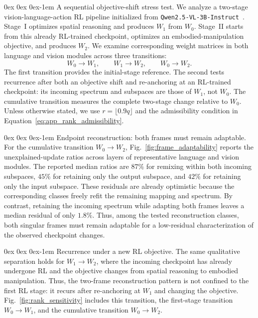 \documentclass[11pt, a4paper]{utda}
\makeatletter
\renewcommand{\paragraph}{%
  \@startsection{paragraph}{4}%
  {\z@}{0ex \@plus 0ex \@minus 0ex}{-1em}%
  {\normalfont\normalsize\bfseries}%
}
\theoremstyle{plain}
\theoremstyle{definition}
\theoremstyle{remark}
\makeatother
\begin{document}
\paragraph{A sequential objective-shift stress test.}
We analyze a two-stage vision-language-action RL pipeline
initialized from
\texttt{Qwen2.5-VL-3B-Instruct}~\cite{yuan2025embodied}.
Stage~I optimizes spatial reasoning and produces $W_1$ from $W_0$.
Stage~II starts from this already RL-trained checkpoint, optimizes
an embodied-manipulation objective, and produces $W_2$.
We examine corresponding weight matrices in both language and
vision modules across three transitions:
\begin{equation}
\label{eq:app-vla_transitions}
    W_0\rightarrow W_1,
    \qquad W_1\rightarrow W_2,
    \qquad W_0\rightarrow W_2.
\end{equation}
The first transition provides the initial-stage reference.
The second tests recurrence after both an objective shift and
re-anchoring at an RL-trained checkpoint: its incoming spectrum
and subspaces are those of $W_1$, not $W_0$.
The cumulative transition measures the complete two-stage change
relative to $W_0$.
Unless otherwise stated, we use $r=\lfloor0.9q\rfloor$ and the
admissibility condition in
Equation~\ref{eq:app_rank_admissibility}.

\paragraph{Endpoint reconstruction: both frames must remain adaptable.}
For the cumulative transition $W_0\rightarrow W_2$,
Fig.~\ref{fig:frame_adaptability} reports the unexplained-update
ratios across layers of representative language and vision modules.
The reported median ratios are $87\%$ for remixing within both
incoming subspaces, $45\%$ for retaining only the output subspace,
and $42\%$ for retaining only the input subspace.
These residuals are already optimistic because the corresponding
classes freely refit the remaining mapping and spectrum.
By contrast, retaining the incoming spectrum while adapting both
frames leaves a median residual of only $1.8\%$.
Thus, among the tested reconstruction classes, both singular
frames must remain adaptable for a low-residual characterization
of the observed checkpoint changes.


\paragraph{Recurrence under a new RL objective.}
The same qualitative separation holds for $W_1\rightarrow W_2$,
where the incoming checkpoint has already undergone RL and the
objective changes from spatial reasoning to embodied manipulation.
Thus, the two-frame reconstruction pattern is not confined to
the first RL stage: it recurs after re-anchoring at $W_1$ and
changing the objective.
Fig.~\ref{fig:rank_sensitivity} includes this transition,
the first-stage transition $W_0\rightarrow W_1$, and the
cumulative transition $W_0\rightarrow W_2$.
\end{document}
